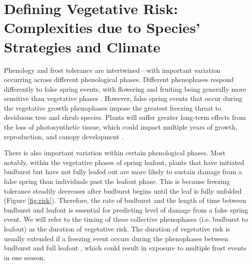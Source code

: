 \documentclass{article}\usepackage[]{graphicx}\usepackage[]{color}
\begin{document}
\section {Defining Vegetative Risk: Complexities due to Species' Strategies and Climate}
Phenology and frost tolerance are intertwined---with important variation occurring across different phenological phases. Different phenophases respond differently to false spring events, with flowering and fruiting being generally more sensitive than vegetative phases \citep{Augspurger2009, Lenz2013}.
However, false spring events that occur during the vegetative growth phenophases impose the greatest freezing threat to deciduous tree and shrub species. Plants will suffer greater long-term effects from the loss of photosynthetic tissue, which could impact multiple years of growth, reproduction, and canopy development \citep{Sakai1987, Vitasse2014}. 

There is also important variation within certain phenological phases. Most notably, within the vegetative phases of spring leafout, plants that have initiated budburst but have not fully leafed out are more likely to sustain damage from a false spring than individuals past the leafout phase. This is because freezing tolerance steadily decreases after budburst begins until the leaf is fully unfolded \citep{Lenz2016} (Figure \ref{fig:risk}). Therefore, the rate of budburst and the length of time between budburst and leafout is essential for predicting level of damage from a false spring event. We will refer to the timing of these collective phenophases (i.e. budburst to leafout) as the duration of vegetative risk. The duration of vegetative risk is usually extended if a freezing event occurs during the phenophases between budburst and full leafout \citep{Augspurger2009}, which could result in exposure to multiple frost events in one season.
\end{document}
